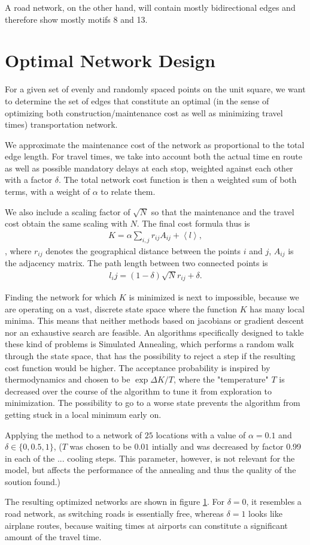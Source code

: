 \documentclass{scrartcl}
\begin{document}
A road network, on the other hand, will contain mostly bidirectional edges and therefore show mostly motifs 8 and 13. 

\section{Optimal Network Design}
For a given set of evenly and randomly spaced points on the unit square, we want to determine the set of edges that constitute an optimal (in the sense of optimizing both construction/maintenance cost as well as minimizing travel times) transportation network.

We approximate the maintenance cost of the network as proportional to the total edge length. For travel times, we take into account both the actual time en route as well as possible mandatory delays at each stop, weighted against each other with a factor $\delta$. The total network cost function is then a weighted sum of both terms, with a weight of $\alpha$ to relate them.  

We also include a scaling factor of $\sqrt{N}$ so that the maintenance and the travel cost obtain the same scaling with $N$. The final cost formula thus is
\begin{align}
 K = \alpha \sum_{i,j} r_{ij} A_{ij} + \left< l \right>,
\end{align}, where $r_{ij}$ denotes the geographical distance between the points $i$ and $j$, $A_{ij}$ is the adjacency matrix.
The path length between two connected points is 
\begin{align}
 l_ij = (1-\delta) \sqrt{N} r_{ij} + \delta.
\end{align}
 
Finding the network for which $K$ is minimized is next to impossible, because we are operating on a vast, discrete state space where the function $K$ has many local minima. This means that neither methods based on jacobians or gradient descent nor an exhaustive search are feasible. 
An algorithms specifically designed to takle these kind of problems is Simulated Annealing, which performs a random walk through the state space, that has the possibility to reject a step if the resulting cost function would be higher. The acceptance probability is inspired by thermodynamics and chosen to be $\exp \Delta K/T$, where the "temperature" $T$ is decreased over the course of the algorithm to tune it from exploration to minimization. The possibility to go to a worse state prevents the algorithm from getting stuck in a local minimum early on.

Applying the method to a network of $25$ locations with a value of $\alpha=0.1$ and $\delta \in \{0, 0.5, 1\}$, ($T$ was chosen to be $0.01$ intially and was decreased by factor 0.99 in each of the ... cooling steps. This parameter, however, is not relevant for the model, but affects the performance of the annealing and thus the quality of the soution found.)

The resulting optimized networks are shown in figure \ref{}. For $\delta=0$, it resembles a road network, as switching roads is essentially free, whereas $\delta=1$ looks like airplane routes, because waiting times at airports can constitute a significant amount of the travel time.
\end{document}
